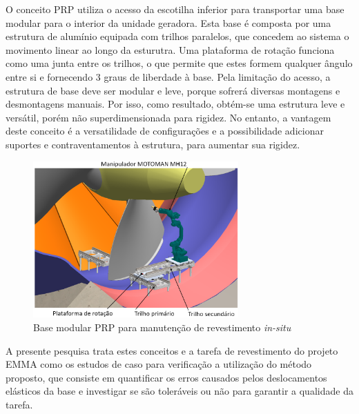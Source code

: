 O conceito PRP utiliza o acesso da escotilha inferior para transportar uma base
modular para o interior da unidade geradora. Esta base é composta por uma
estrutura de alumínio equipada com trilhos paralelos, que concedem ao sistema o
movimento linear ao longo da esturutra. Uma plataforma de rotação funciona como
uma junta entre os trilhos, o que permite que estes formem qualquer ângulo entre
si e fornecendo 3 graus de liberdade à base. Pela limitação do acesso, a
estrutura de base deve ser modular e leve, porque sofrerá diversas montagens e
desmontagens manuais. Por isso, como resultado, obtém-se uma estrutura leve e
versátil, porém não superdimensionada para rigidez. No entanto, a vantagem deste
conceito é a versatilidade de configurações e a possibilidade adicionar suportes
e contraventamentos à estrutura, para aumentar sua rigidez.

\begin{figure}[h]
	\centering 
 	\includegraphics[width=0.70\textwidth]{figs/prp_turbina}
 	\caption{Base modular PRP para manutenção de revestimento \textit{in-situ}}
 	\label{fig::prp_turbina}
\end{figure}

A presente pesquisa trata estes conceitos e a tarefa de revestimento do projeto
EMMA como os estudos de caso para verificação a utilização do método proposto,
que consiste em quantificar os erros causados pelos deslocamentos elásticos da
base e investigar se são toleráveis ou não para garantir a qualidade da tarefa.


















